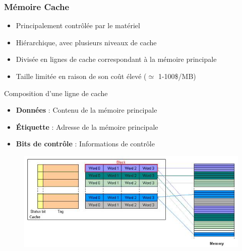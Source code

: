 \documentclass[10pt]{beamer}
\begin{document}
\begin{frame}
    \frametitle{Mémoire Cache}
    \begin{itemize}
        \item Principalement contrôlée par le matériel
        \item Hiérarchique, avec plusieurs niveaux de cache
        \item Divisée en lignes de cache correspondant \`a la m\'emoire
              principale
        \item Taille limitée en raison de son coût élevé ($\simeq$
              1-100\$/MB)
    \end{itemize}
    \begin{block}{Composition d'une ligne de cache}
        \begin{itemize}
            \item \textbf{Données} : Contenu de la mémoire principale
            \item \textbf{Étiquette} : Adresse de la mémoire principale
            \item \textbf{Bits de contrôle} : Informations de contrôle
        \end{itemize}
    \end{block}
    \begin{figure}
        \centering
        \includegraphics[width=.5\textwidth]{figures/Direct_mapped_cache.JPG}
    \end{figure}
\end{frame}
\end{document}
